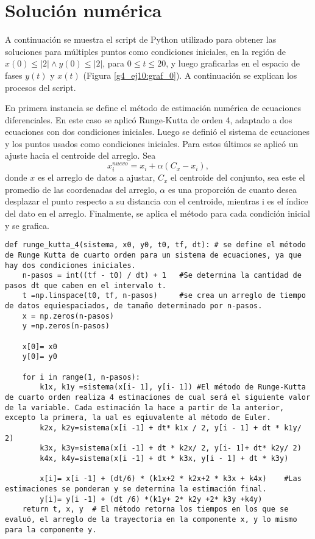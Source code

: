 \documentclass[../portafolio.tex]{subfiles}
\begin{document}
\section{Solución numérica}
A continuación se muestra el script de Python utilizado para obtener las soluciones para múltiples puntos como condiciones iniciales, en la región de $x(0)\leq |2| \wedge y(0) \leq |2|$, para $0\leq t \leq 20$, y luego graficarlas en el espacio de fases $y(t)$ y  $x(t)$ (Figura \ref{g4_ej10:graf_0}). 
A continuación se explican los procesos del script.

En primera instancia se define el método de estimación numérica de ecuaciones diferenciales. En este caso se aplicó Runge-Kutta de orden 4, adaptado a dos ecuaciones con dos condiciones iniciales. Luego se definió el sistema de ecuaciones y los puntos usados como condiciones iniciales. Para estos últimos se aplicó un ajuste hacia el centroide del arreglo. Sea
\begin{equation}
x_{i}^{nuevo}=x_i + \alpha(C_x - x_i),
\end{equation}
donde $x$ es el arreglo de datos a ajustar, $C_x$ el centroide del conjunto, sea este el promedio de las coordenadas del arreglo, $\alpha$ es una proporción de cuanto desea desplazar el punto respecto a su distancia con el centroide, mientras i es el índice del dato en el arreglo. Finalmente, se aplica el método para cada condición inicial y se grafica.
\begin{verbatim}
def runge_kutta_4(sistema, x0, y0, t0, tf, dt):	# se define el método de Runge Kutta de cuarto orden para un sistema de ecuaciones, ya que hay dos condiciones iniciales.
    n-pasos = int((tf - t0) / dt) + 1	#Se determina la cantidad de pasos dt que caben en el intervalo t.
    t =np.linspace(t0, tf, n-pasos)  	#se crea un arreglo de tiempo de datos equiespaciados, de tamaño determinado por n-pasos.
    x = np.zeros(n-pasos) 
    y =np.zeros(n-pasos) 

    x[0]= x0
    y[0]= y0
    
    for i in range(1, n-pasos):
        k1x, k1y =sistema(x[i- 1], y[i- 1])	#El método de Runge-Kutta de cuarto orden realiza 4 estimaciones de cual será el siguiente valor de la variable. Cada estimación la hace a partir de la anterior, excepto la primera, la ual es eqiuvalente al método de Euler.
        k2x, k2y=sistema(x[i -1] + dt* k1x / 2, y[i - 1] + dt * k1y/ 2)
        k3x, k3y=sistema(x[i -1] + dt * k2x/ 2, y[i- 1]+ dt* k2y/ 2)
        k4x, k4y=sistema(x[i -1] + dt * k3x, y[i - 1] + dt * k3y)

        x[i]= x[i -1] + (dt/6) * (k1x+2 * k2x+2 * k3x + k4x)	#Las estimaciones se ponderan y se determina la estimación final.
        y[i]= y[i -1] + (dt /6) *(k1y+ 2* k2y +2* k3y +k4y)
    return t, x, y 	# El método retorna los tiempos en los que se evaluó, el arreglo de la trayectoria en la componente x, y lo mismo para la componente y.
\end{verbatim}
\end{document}
